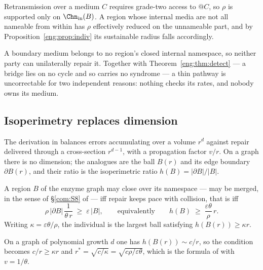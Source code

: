 \begin{proposition}
\label{eng:prop:closurerepair}
Retransmission over a medium $C$ requires grade-two access to $@C$, so
$\rho$ is supported only on $\Chn_{\mathrm{in}}(B)$. A region whose
internal media are not all nameable from within has $\rho$ effectively
reduced on the unnameable part, and by
Proposition~\ref{eng:prop:indiv} its sustainable radius falls accordingly.
\end{proposition}

\begin{corollary}\label{eng:bridges-fail-twice}
A boundary medium belongs to no region's closed internal namespace, so
neither party can unilaterally repair it. Together with
Theorem~\ref{eng:thm:detect} --- a bridge lies on no cycle and so carries no
syndrome --- a thin pathway is uncorrectable for two independent reasons:
nothing checks its rates, and nobody owns its medium.
\end{corollary}

\subsection{Isoperimetry replaces dimension}\label{eng:S8.3}

The derivation in \cite{compaut} balances errors accumulating over a volume
$r^d$ against repair delivered through a cross-section $r^{d-1}$, with a
propagation factor $v/r$. On a graph there is no dimension; the analogues
are the ball $B(r)$ and its edge boundary $\partial B(r)$, and their ratio
is the isoperimetric ratio $h(B) = |\partial B| / |B|$.

\begin{proposition}\label{eng:prop:indiv}
A region $B$ of the enzyme graph may close over its namespace --- may be
merged, in the sense of \S\ref{com:S8} of \chComp --- iff repair keeps pace with
collision, that is iff
\[
  \rho\,|\partial B|\,\frac{1}{\theta\,r} \;\geq\; \varepsilon\,|B|,
  \qquad\text{equivalently}\qquad
  h(B) \;\geq\; \frac{\varepsilon\theta}{\rho}\, r .
\]
Writing $\kappa = \varepsilon\theta/\rho$, the individual is the largest
ball satisfying $h(B(r)) \geq \kappa r$.
\end{proposition}

\begin{corollary}\label{eng:recovering-r}
On a graph of polynomial growth $d$ one has $h(B(r)) \sim c/r$, so the
condition becomes $c/r \geq \kappa r$ and
$r^\ast = \sqrt{c/\kappa} = \sqrt{c\rho/\varepsilon\theta}$, which is the
formula of \cite{compaut} with $v = 1/\theta$.
\end{corollary}

